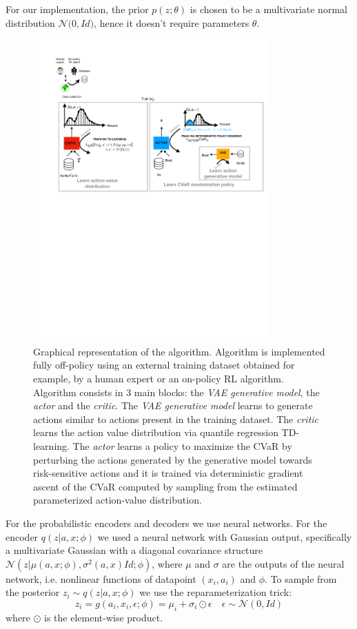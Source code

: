 For our implementation, the prior $p(z; \theta)$ is chosen to be a multivariate normal
distribution $\mathcal{N}\big( 0,Id\big )$, hence it doesn't require parameters $\theta$.
\begin{figure}[ht]
    \centering
    \includegraphics[width=0.8\textwidth]{images/diagram.pdf}
    \caption{Graphical representation of the algorithm.
    Algorithm is implemented fully off-policy using an external training dataset obtained
    for example, by a human expert or an on-policy RL algorithm.
    Algorithm consists in 3 main blocks: the \textit{VAE generative model}, the \textit{actor}
    and the \textit{critic}.
    The \textit{VAE generative model} learns to generate actions similar to actions present in the training dataset.
    The \textit{critic} learns 
    the action value distribution via quantile regression TD-learning.
    The \textit{actor} learns a policy to maximize the CVaR by perturbing the actions 
    generated by the generative model towards risk-sensitive actions and it is trained
    via deterministic gradient ascent of the CVaR computed by sampling from the 
    estimated parameterized action-value distribution.}
    \label{fig:diagram}

\end{figure}
For the probabilistic encoders and decoders we use neural networks.
For the encoder $q(z|a,x;\phi)$ we used a neural network with  Gaussian output, specifically a 
multivariate Gaussian with a diagonal covariance structure $\mathcal{N}(z | \mu(a,x;\phi), \sigma^2(a,x)Id ; \phi)$,
where $\mu$ and $\sigma$ are the outputs of the neural network, i.e. nonlinear 
functions of datapoint $(x_i,a_i)$ and $\phi$.
To sample from the posterior $z_i \sim q(z|a,x; \phi)$ we use the reparameterization trick:
\begin{equation}
    z_i = g(a_i,x_i, \epsilon; \phi)=\mu_i + \sigma_i \odot \epsilon \quad \epsilon \sim  \mathcal{N}(0,Id)
\end{equation}
where $\odot$ is the element-wise product.

